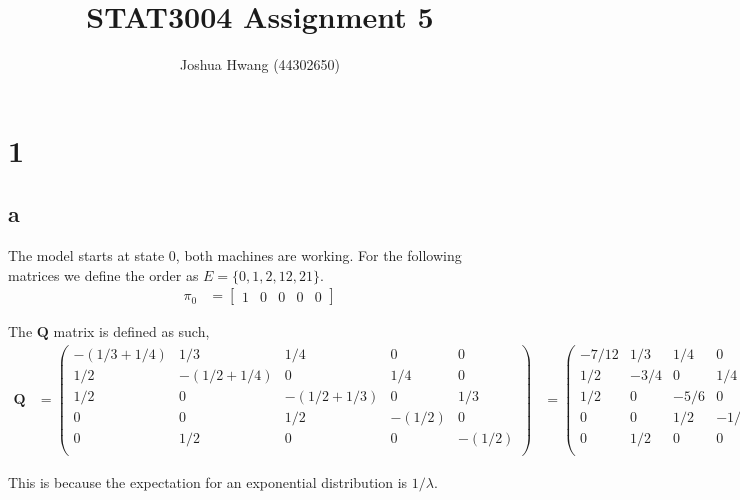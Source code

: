 \documentclass{article}
\title{STAT3004 Assignment 5}
\author{Joshua Hwang (44302650)}
\begin{document}
\maketitle
\section{1}
\subsection{a}
The model starts at state 0, both machines are working.
For the following matrices we define the order as
$E = \{0,1,2,12,21\}$.
\begin{align*}
    \pi_0
    &=
    \begin{bmatrix}
        1 & 0 & 0 & 0 & 0
    \end{bmatrix}
\end{align*}

The $\bm{Q}$ matrix is defined as such,
\begin{align*}
    \bm{Q}
    &=
    \begin{pmatrix}
        -(1/3 + 1/4) & 1/3          & 1/4          & 0      & 0 \\
        1/2          & -(1/2 + 1/4) & 0            & 1/4    & 0 \\
        1/2          & 0            & -(1/2 + 1/3) & 0      & 1/3 \\
        0            & 0            & 1/2          & -(1/2) & 0 \\
        0            & 1/2          & 0            & 0      & -(1/2) \\
    \end{pmatrix}
    &=
    \begin{pmatrix}
        -7/12        & 1/3          & 1/4          & 0      & 0 \\
        1/2          & -3/4         & 0            & 1/4    & 0 \\
        1/2          & 0            & -5/6         & 0      & 1/3 \\
        0            & 0            & 1/2          & -1/2   & 0 \\
        0            & 1/2          & 0            & 0      & -1/2 \\
    \end{pmatrix}
\end{align*}

This is because the expectation for an exponential distribution is $1/\lambda$.
\end{document}
